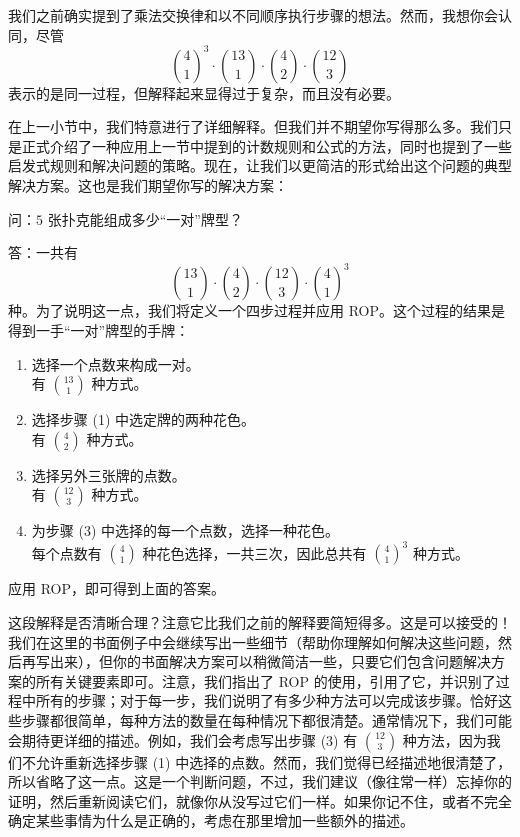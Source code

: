 \begin{example}[一对]
    我们之前确实提到了乘法交换律和以不同顺序执行步骤的想法。然而，我想你会认同，尽管
    \[{4 \choose 1}^3 \cdot {13 \choose 1} \cdot {4 \choose 2} \cdot {12 \choose 3}\]
    表示的是同一过程，但解释起来显得过于复杂，而且没有必要。

    在上一小节中，我们特意进行了详细解释。但我们并不期望你写得那么多。我们只是正式介绍了一种应用上一节中提到的计数规则和公式的方法，同时也提到了一些启发式规则和解决问题的策略。现在，让我们以更简洁的形式给出这个问题的典型解决方案。这也是我们期望你写的解决方案：

    \begin{questions}{问}：$5$ 张扑克能组成多少``一对''牌型？\end{questions}

    \begin{proofs}{答}：一共有
        \[{13 \choose 1} \cdot {4 \choose 2} \cdot {12 \choose 3} \cdot {4 \choose 1}^3\]
        种。为了说明这一点，我们将定义一个四步过程并应用 ROP。这个过程的结果是得到一手``一对''牌型的手牌：
        \begin{enumerate}[label=(\arabic*)]
            \item 选择一个点数来构成一对。\\
                  有 ${13 \choose 1}$ 种方式。
            \item 选择步骤 (1) 中选定牌的两种花色。\\
                  有 ${4 \choose 2}$ 种方式。
            \item 选择另外三张牌的点数。\\
                  有 ${12 \choose 3}$ 种方式。
            \item 为步骤 (3) 中选择的每一个点数，选择一种花色。\\
                  每个点数有 ${4 \choose 1}$ 种花色选择，一共三次，因此总共有 ${4 \choose 1}^3$ 种方式。
        \end{enumerate}
        应用 ROP，即可得到上面的答案。
    \end{proofs}

    这段解释是否清晰合理？注意它比我们之前的解释要简短得多。这是可以接受的！我们在这里的书面例子中会继续写出一些细节（帮助你理解如何解决这些问题，然后再写出来），但你的书面解决方案可以稍微简洁一些，只要它们包含问题解决方案的所有关键要素即可。注意，我们指出了 ROP 的使用，引用了它，并识别了过程中所有的步骤；对于每一步，我们说明了有多少种方法可以完成该步骤。恰好这些步骤都很简单，每种方法的数量在每种情况下都很清楚。通常情况下，我们可能会期待更详细的描述。例如，我们会考虑写出步骤 (3) 有 ${12 \choose 3}$ 种方法，因为我们不允许重新选择步骤 (1) 中选择的点数。然而，我们觉得已经描述地很清楚了，所以省略了这一点。这是一个判断问题，不过，我们建议（像往常一样）忘掉你的证明，然后重新阅读它们，就像你从没写过它们一样。如果你记不住，或者不完全确定某些事情为什么是正确的，考虑在那里增加一些额外的描述。


\end{example}
